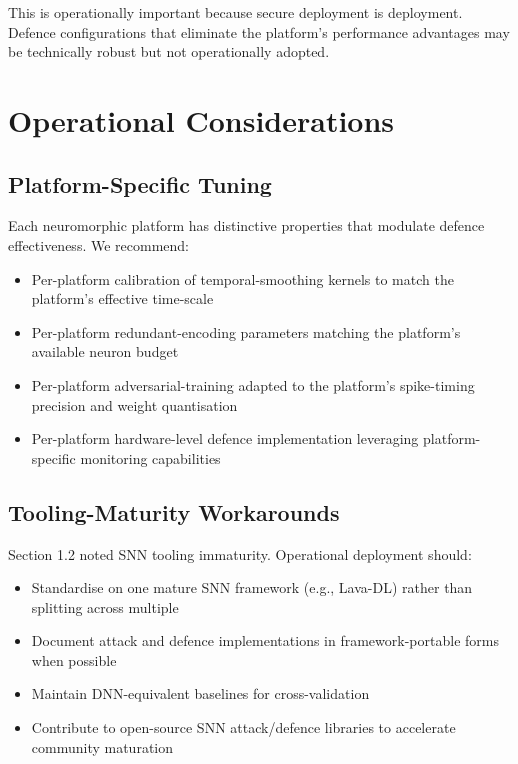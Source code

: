\documentclass[sigconf,nonacm]{acmart}
\begin{document}
This is operationally important because secure deployment is
deployment. Defence configurations that eliminate the platform's
performance advantages may be technically robust but not
operationally adopted.

\section{Operational Considerations}

\subsection{Platform-Specific Tuning}

Each neuromorphic platform has distinctive properties that
modulate defence effectiveness. We recommend:

\begin{itemize}
  \item Per-platform calibration of temporal-smoothing kernels
        to match the platform's effective time-scale
  \item Per-platform redundant-encoding parameters matching the
        platform's available neuron budget
  \item Per-platform adversarial-training adapted to the
        platform's spike-timing precision and weight quantisation
  \item Per-platform hardware-level defence implementation
        leveraging platform-specific monitoring capabilities
\end{itemize}

\subsection{Tooling-Maturity Workarounds}

Section 1.2 noted SNN tooling immaturity. Operational deployment
should:

\begin{itemize}
  \item Standardise on one mature SNN framework (e.g., Lava-DL)
        rather than splitting across multiple
  \item Document attack and defence implementations in
        framework-portable forms when possible
  \item Maintain DNN-equivalent baselines for cross-validation
  \item Contribute to open-source SNN attack/defence libraries
        to accelerate community maturation
\end{itemize}
\end{document}

